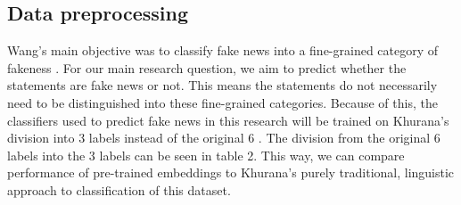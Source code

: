 \subsection{Data preprocessing}

Wang's main objective was to classify fake news into a fine-grained category of fakeness \cite{wang2018}.
For our main research question, we aim to predict whether the statements are fake news or not. 
This means the statements do not necessarily need to be distinguished into these fine-grained categories.
Because of this, the classifiers used to predict fake news in this research will be trained on Khurana's division into 3 labels instead of the original 6 \cite{khurana2017}.
The division from the original 6 labels into the 3 labels can be seen in table 2. 
This way, we can compare performance of pre-trained embeddings to Khurana's purely traditional, linguistic approach to classification of this dataset.

